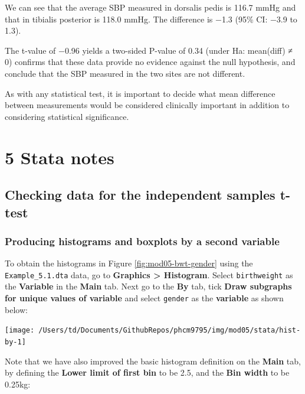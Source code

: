 \documentclass[
]{memoir}
\begin{document}
We can see that the average SBP measured in dorsalis pedis is 116.7 mmHg and that in tibialis posterior is 118.0 mmHg. The difference is −1.3 (95\% CI: −3.9 to 1.3).

The t-value of −0.96 yields a two-sided P-value of 0.34 (under Ha: mean(diff) ≠ 0) confirms that these data provide no evidence against the null hypothesis, and conclude that the SBP measured in the two sites are not different.

As with any statistical test, it is important to decide what mean difference between measurements would be considered clinically important in addition to considering statistical significance.

\hypertarget{stata-notes-3}{%
\chapter*{\texorpdfstring{\textbf{5} Stata notes}{5 Stata notes}}\label{stata-notes-3}}

\hypertarget{checking-data-for-the-independent-samples-t-test}{%
\section{Checking data for the independent samples t-test}\label{checking-data-for-the-independent-samples-t-test}}

\hypertarget{producing-histograms-and-boxplots-by-a-second-variable}{%
\subsection{Producing histograms and boxplots by a second variable}\label{producing-histograms-and-boxplots-by-a-second-variable}}

To obtain the histograms in Figure \ref{fig:mod05-bwt-gender} using the \texttt{Example\_5.1.dta} data, go to \textbf{Graphics \textgreater{} Histogram}. Select \texttt{birthweight} as the \textbf{Variable} in the \textbf{Main} tab. Next go to the \textbf{By} tab, tick \textbf{Draw subgraphs for unique values of variable} and select \texttt{gender} as the \textbf{variable} as shown below:

\texttt{[image: /Users/td/Documents/GithubRepos/phcm9795/img/mod05/stata/hist-by-1]}

Note that we have also improved the basic histogram definition on the \textbf{Main} tab, by defining the \textbf{Lower limit of first bin} to be 2.5, and the \textbf{Bin width} to be 0.25kg:
\end{document}
